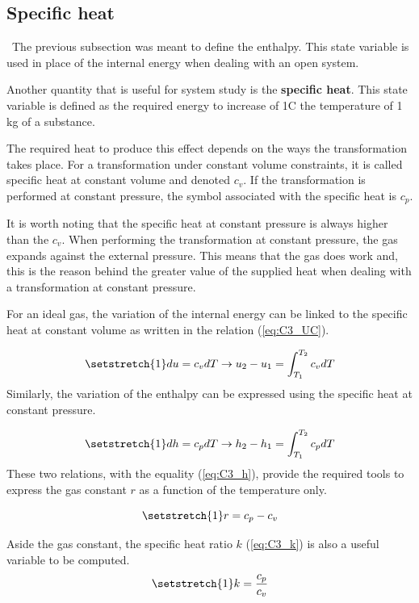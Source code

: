 \subsection{Specific heat}
\quad\ The previous subsection was meant to define the enthalpy. This state variable is used in place of the internal energy when dealing with an open system.

Another quantity that is useful for system study is the \textbf{specific heat}. This state variable is defined as the required energy to increase of 1\degree C the temperature of 1 kg of a substance. 
 
The required heat to produce this effect depends on the ways the transformation takes place. For a transformation under constant volume constraints, it is called specific heat at constant volume and denoted $c_v$. If the transformation is performed at constant pressure, the symbol associated with the specific heat is $c_p$.

It is worth noting that the specific heat at constant pressure is always higher than the $c_v$. When performing the transformation at constant pressure, the gas expands against the external pressure. This means that the gas does work and, this is the reason behind the greater value of the supplied heat when dealing with a transformation at constant pressure. 

For an ideal gas, the variation of the internal energy can be linked to the specific heat at constant volume as written in the relation (\ref{eq:C3_UC}).

\begin{equation}
\setstretch{1}
du = c_vdT \rightarrow u_2 - u_1 = \int_{T_1}^{T_2} c_vdT\label{eq:C3_UC}
\end{equation} 
Similarly, the variation of the enthalpy can be expressed using the specific heat at constant pressure.

\begin{equation}
\setstretch{1}
dh = c_pdT \rightarrow h_2 - h_1 = \int_{T_1}^{T_2} c_pdT\label{eq:C3_UP}
\end{equation} 
These two relations, with the equality (\ref{eq:C3_h}), provide the required tools to express the gas constant $r$ as a function of the temperature only. 

\begin{equation}
\setstretch{1}
r = c_p - c_v \label{eq:C3_r}
\end{equation}

Aside the gas constant, the specific heat ratio $k$ (\ref{eq:C3_k}) is also a useful variable to be computed.
\begin{equation}
\setstretch{1}
k = \frac{c_p}{c_v} \label{eq:C3_k}
\end{equation}
